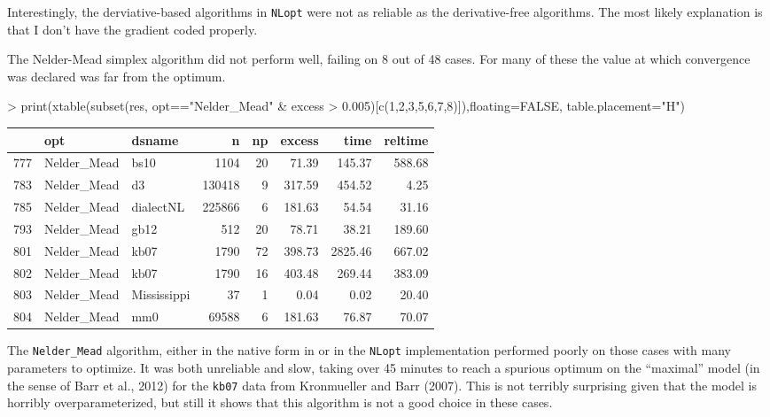 \documentclass[article]{jss}
\begin{document}
Interestingly, the derviative-based algorithms in \texttt{NLopt} were
not as reliable as the derivative-free algorithms. The most likely
explanation is that I don't have the gradient coded properly.

The Nelder-Mead simplex algorithm did not perform well, failing on 8 out
of 48 cases. For many of these the value at which convergence was
declared was far from the optimum.

\begin{Schunk}
\begin{Sinput}
> print(xtable(subset(res, opt=="Nelder_Mead" & excess > 0.005)[c(1,2,3,5,6,7,8)]),floating=FALSE, table.placement="H")
\end{Sinput}
% latex table generated in R 3.1.3 by xtable 1.7-4 package
% Thu Aug 27 12:42:05 2015
\begin{tabular}{rllrrrrr}
  \hline
 & opt & dsname & n & np & excess & time & reltime \\ 
  \hline
777 & Nelder\_Mead & bs10 & 1104 &  20 & 71.39 & 145.37 & 588.68 \\ 
  783 & Nelder\_Mead & d3 & 130418 &   9 & 317.59 & 454.52 & 4.25 \\ 
  785 & Nelder\_Mead & dialectNL & 225866 &   6 & 181.63 & 54.54 & 31.16 \\ 
  793 & Nelder\_Mead & gb12 & 512 &  20 & 78.71 & 38.21 & 189.60 \\ 
  801 & Nelder\_Mead & kb07 & 1790 &  72 & 398.73 & 2825.46 & 667.02 \\ 
  802 & Nelder\_Mead & kb07 & 1790 &  16 & 403.48 & 269.44 & 383.09 \\ 
  803 & Nelder\_Mead & Mississippi &  37 &   1 & 0.04 & 0.02 & 20.40 \\ 
  804 & Nelder\_Mead & mm0 & 69588 &   6 & 181.63 & 76.87 & 70.07 \\ 
   \hline
\end{tabular}\end{Schunk}






 The \texttt{Nelder\_Mead} algorithm, either in the native form in
 or in the \texttt{NLopt} implementation performed poorly
on those cases with many parameters to optimize. It was both unreliable
and slow, taking over 45 minutes to reach a spurious optimum on the
``maximal'' model (in the sense of Barr et al., 2012) for the
\texttt{kb07} data from Kronmueller and Barr (2007). This is not
terribly surprising given that the model is horribly overparameterized,
but still it shows that this algorithm is not a good choice in these
cases.
\end{document}
